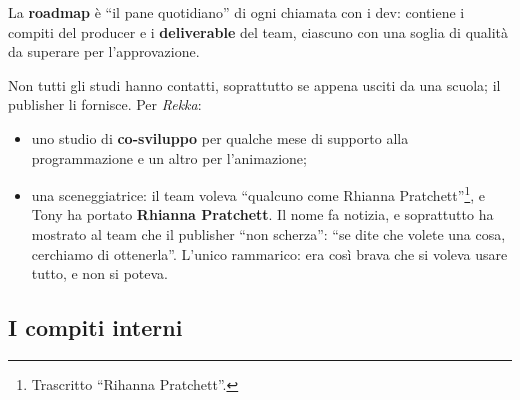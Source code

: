 La \textbf{roadmap} è ``il pane quotidiano'' di ogni chiamata con i dev: contiene
i compiti del producer e i \textbf{deliverable} del team, ciascuno con una soglia
di qualità da superare per l'approvazione.

Non tutti gli studi hanno contatti, soprattutto se appena usciti da una scuola; il
publisher li fornisce. Per \emph{Rekka}:
\begin{itemize}
  \item uno studio di \textbf{co-sviluppo} per qualche mese di supporto alla
        programmazione e un altro per l'animazione;
  \item una sceneggiatrice: il team voleva ``qualcuno come Rhianna
        Pratchett''\footnote{Trascritto ``Rihanna Pratchett''.}, e Tony ha
        portato \textbf{Rhianna Pratchett}. Il nome fa notizia, e soprattutto ha
        mostrato al team che il publisher ``non scherza'': ``se dite che volete una
        cosa, cerchiamo di ottenerla''. L'unico rammarico: era così brava che si
        voleva usare tutto, e non si poteva.
\end{itemize}

\subsection{I compiti interni}

